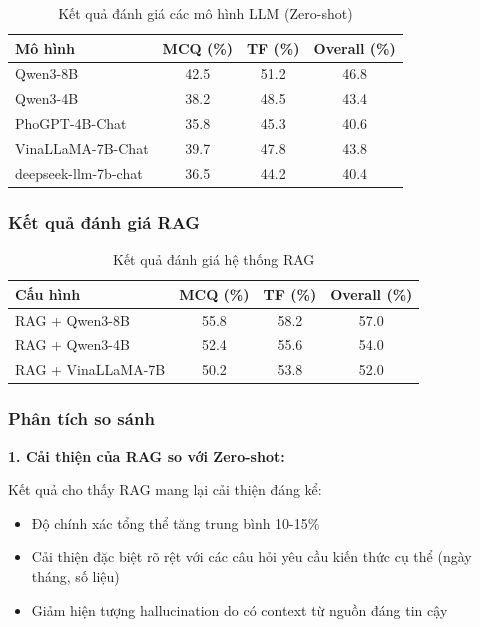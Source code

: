 \begin{table}[H]
\centering
\caption{Kết quả đánh giá các mô hình LLM (Zero-shot)}
\label{tab:llm-results}
\begin{tabular}{|l|c|c|c|}
\hline
\textbf{Mô hình} & \textbf{MCQ (\%)} & \textbf{TF (\%)} & \textbf{Overall (\%)} \\
\hline
Qwen3-8B & 42.5 & 51.2 & 46.8 \\
Qwen3-4B & 38.2 & 48.5 & 43.4 \\
PhoGPT-4B-Chat & 35.8 & 45.3 & 40.6 \\
VinaLLaMA-7B-Chat & 39.7 & 47.8 & 43.8 \\
deepseek-llm-7b-chat & 36.5 & 44.2 & 40.4 \\
\hline
\end{tabular}
\end{table}

\subsubsection{Kết quả đánh giá RAG}

\begin{table}[H]
\centering
\caption{Kết quả đánh giá hệ thống RAG}
\label{tab:rag-results}
\begin{tabular}{|l|c|c|c|}
\hline
\textbf{Cấu hình} & \textbf{MCQ (\%)} & \textbf{TF (\%)} & \textbf{Overall (\%)} \\
\hline
RAG + Qwen3-8B & 55.8 & 58.2 & 57.0 \\
RAG + Qwen3-4B & 52.4 & 55.6 & 54.0 \\
RAG + VinaLLaMA-7B & 50.2 & 53.8 & 52.0 \\
\hline
\end{tabular}
\end{table}

\subsubsection{Phân tích so sánh}

\textbf{1. Cải thiện của RAG so với Zero-shot:}

Kết quả cho thấy RAG mang lại cải thiện đáng kể:
\begin{itemize}
    \item Độ chính xác tổng thể tăng trung bình 10-15\%
    \item Cải thiện đặc biệt rõ rệt với các câu hỏi yêu cầu kiến thức cụ thể (ngày tháng, số liệu)
    \item Giảm hiện tượng hallucination do có context từ nguồn đáng tin cậy
\end{itemize}

